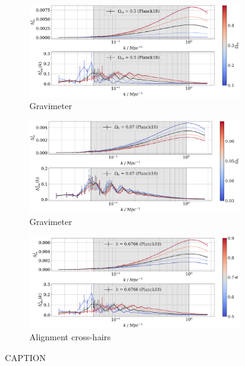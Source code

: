 \documentclass[floats,floatfix,showpacs,amssymb,prd,superscriptaddress,nofootinbib]{revtex4-2} %
\begin{document}
\begin{figure}[H]
     \centering
     \begin{subfigure}[b]{1.0\textwidth}
         \centering
         \includegraphics[width=\textwidth]{images/ic_power_spectra/compare_cosmologies_averaged_power_spectra_Om.png}
         \caption{Gravimeter}
         \label{fig:averaged_IC_power_spectra_Om}
     \end{subfigure}
     \hfill
     \begin{subfigure}[b]{1.0\textwidth}
         \centering
         \includegraphics[width=\textwidth]{images/ic_power_spectra/compare_cosmologies_averaged_power_spectra_Ob.png}
         \caption{Gravimeter}
         \label{fig:averaged_IC_power_spectra_Ob}
     \end{subfigure}
     \hfill
     \begin{subfigure}[b]{1.0\textwidth}
         \centering
         \includegraphics[width=\textwidth]{images/ic_power_spectra/compare_cosmologies_averaged_power_spectra_h.png}
         \caption{Alignment cross-hairs}
         \label{fig:averaged_IC_power_spectra_h}
     \end{subfigure}
        \caption{CAPTION}
        \label{fig:averaged_IC_power_spectra}
\end{figure}
\end{document}
